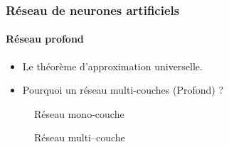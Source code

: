 \begin{frame}
\frametitle{Réseau de neurones artificiels}
\framesubtitle{Réseau profond}
\begin{itemize}
    \item<1->   Le théorème d'approximation universelle.
    
    
    \item<2->   Pourquoi un réseau multi-couches (Profond) ?
\end{itemize}
\centering
\begin{figure}
    \begin{overprint}
        \centering\caption{Réseau
        mono-couche}
        \centering\caption{Réseau multi--couche}
    \end{overprint}
\end{figure}
\end{frame}

